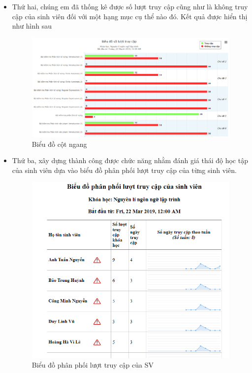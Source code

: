 \begin{itemize}
	\item Thứ hai, chúng em đã thống kê được số lượt truy cập cũng như là không truy cập của sinh viên đối với một hạng mục cụ thể nào đó. Kết quả được hiển thị như hình sau
	
	\begin{center}
		\begin{figure}[htp]
			\begin{center}
				\includegraphics[width=1\linewidth]{img/27}
			\end{center}
			\caption{Biểu đồ cột ngang}
			\label{refhinh72}
		\end{figure}
	\end{center}

	\vskip 5cm
	\item Thứ ba, xây dựng thành công được chức năng nhằm đánh giá thái độ học tập của sinh viên dựa vào biểu đồ phân phối lượt truy cập của từng sinh viên.
	
	\begin{center}
		\begin{figure}[htp]
			\begin{center}
				\includegraphics[width=0.8\linewidth]{img/29}
			\end{center}
			\caption{Biểu đồ phân phối lượt truy cập của SV}
			\label{refhinh73}
		\end{figure}
	\end{center}


\end{itemize}
